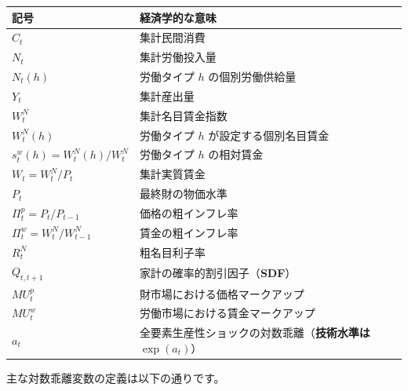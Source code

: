 \documentclass[
  japanese,
  lualatex,
  ja=standard,
  12pt,
  a4paper]{ltjsarticle}
\newcounter{none} %
\begin{document}
{\def\LTcaptype{none} %
\begin{longtable}[]{@{}ll@{}}
\toprule\noalign{}
記号 & 経済学的な意味 \\
\midrule\noalign{}
\endhead
\bottomrule\noalign{}
\endlastfoot
\(C_t\) & 集計民間消費 \\
\(N_t\) & 集計労働投入量 \\
\(N_t(h)\) & 労働タイプ \(h\) の個別労働供給量 \\
\(Y_t\) & 集計産出量 \\
\(W_t^N\) & 集計名目賃金指数 \\
\(W_t^N(h)\) & 労働タイプ \(h\) が設定する個別名目賃金 \\
\(s_t^w(h)=W_t^N(h)/W_t^N\) & 労働タイプ \(h\) の相対賃金 \\
\(W_t=W_t^N/P_t\) & 集計実質賃金 \\
\(P_t\) & 最終財の物価水準 \\
\(\Pi_t^p=P_t/P_{t-1}\) & 価格の粗インフレ率 \\
\(\Pi_t^w=W_t^N/W_{t-1}^N\) & 賃金の粗インフレ率 \\
\(R_t^N\) & 粗名目利子率 \\
\(Q_{t,t+1}\) & 家計の確率的割引因子（\textbf{SDF}） \\
\(MU_t^p\) & 財市場における価格マークアップ \\
\(MU_t^w\) & 労働市場における賃金マークアップ \\
\(a_t\) & 全要素生産性ショックの対数乖離（\textbf{技術水準は
\(\exp(a_t)\)}） \\
\end{longtable}
}

主な対数乖離変数の定義は以下の通りです。
\end{document}
